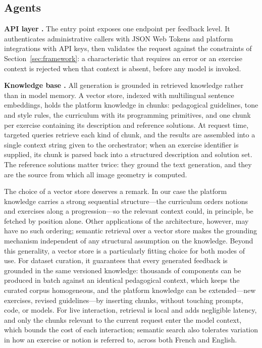 \documentclass[10pt]{article}
\newcommand{\cmp}[1]{\raisebox{0.5pt}{\textcircled{\raisebox{-0.9pt}{\scriptsize #1}}}}
\begin{document}
\subsection{Agents}
\label{sec:agents}

\textbf{API layer \cmp{1}.} The entry point exposes one endpoint per feedback level. It authenticates administrative callers with JSON Web Tokens and platform integrations with API keys, then validates the request against the constraints of Section~\ref{sec:framework}: a characteristic that requires an error or an exercise context is rejected when that context is absent, before any model is invoked.

\textbf{Knowledge base \cmp{2}.} All generation is grounded in retrieved knowledge rather than in model memory. A vector store, indexed with multilingual sentence embeddings, holds the platform knowledge in chunks: pedagogical guidelines, tone and style rules, the curriculum with its programming primitives, and one chunk per exercise containing its description and reference solutions. At request time, targeted queries retrieve each kind of chunk, and the results are assembled into a single context string given to the orchestrator; when an exercise identifier is supplied, its chunk is parsed back into a structured description and solution set. The reference solutions matter twice: they ground the text generation, and they are the source from which all image geometry is computed.

The choice of a vector store deserves a remark. In our case the platform knowledge carries a strong sequential structure---the curriculum orders notions and exercises along a progression---so the relevant context could, in principle, be fetched by position alone. Other applications of the architecture, however, may have no such ordering; semantic retrieval over a vector store makes the grounding mechanism independent of any structural assumption on the knowledge. Beyond this generality, a vector store is a particularly fitting choice for both modes of use. For dataset curation, it guarantees that every generated feedback is grounded in the same versioned knowledge: thousands of components can be produced in batch against an identical pedagogical context, which keeps the curated corpus homogeneous, and the platform knowledge can be extended---new exercises, revised guidelines---by inserting chunks, without touching prompts, code, or models. For live interaction, retrieval is local and adds negligible latency, and only the chunks relevant to the current request enter the model context, which bounds the cost of each interaction; semantic search also tolerates variation in how an exercise or notion is referred to, across both French and English.
\end{document}
